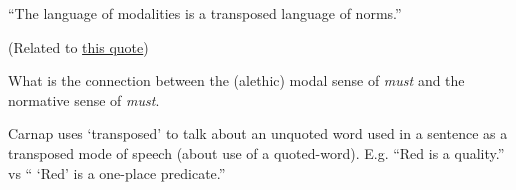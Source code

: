 ``The language of modalities is a transposed language of norms.''

(Related to \href{doc/2 phil/People/Sellars/Quotes/Describing the world without modality|related to}{this quote})

What is the connection between the (alethic) modal sense of \emph{must} and the
 normative sense of \emph{must}.

Carnap uses `transposed' to talk about an unquoted word used in a sentence as a
transposed mode of speech (about use of a quoted-word). E.g. ``Red is a
quality.'' vs `` `Red' is a one-place predicate.''
